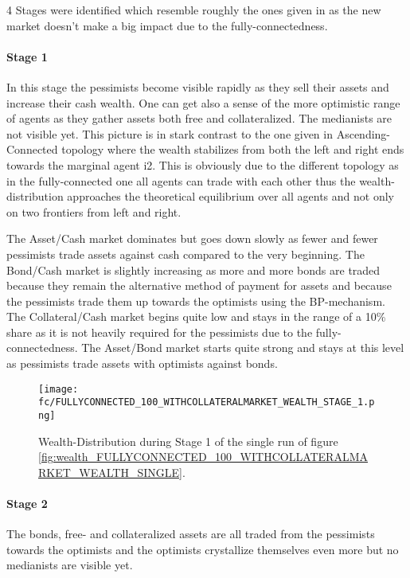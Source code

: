 \documentclass[Bachelorarbeit.tex]{subfiles}
\begin{document}
4 Stages were identified which resemble roughly the ones given in \cite{Breuer2015} as the new market doesn't make a big impact due to the fully-connectedness.


\paragraph{Stage 1}
In this stage the pessimists become visible rapidly as they sell their assets and increase their cash wealth. One can get also a sense of the more optimistic range of agents as they gather assets both free and collateralized. The medianists are not visible yet. This picture is in stark contrast to the one given in Ascending-Connected topology where the wealth stabilizes from both the left and right ends towards the marginal agent i2. This is obviously due to the different topology as in the fully-connected one all agents can trade with each other thus the wealth-distribution approaches the theoretical equilibrium over all agents and not only on two frontiers from left and right.

\medskip

The Asset/Cash market dominates but goes down slowly as fewer and fewer pessimists trade assets against cash compared to the very beginning. The Bond/Cash market is slightly increasing as more and more bonds are traded because they remain the alternative method of payment for assets and because the pessimists trade them up towards the optimists using the BP-mechanism. The Collateral/Cash market begins quite low and stays in the range of a 10\% share as it is not heavily required for the pessimists due to the fully-connectedness. The Asset/Bond market starts quite strong and stays at this level as pessimists trade assets with optimists against bonds.

\begin{figure}[H]
	\centering
  \texttt{[image: fc/FULLYCONNECTED\_100\_WITHCOLLATERALMARKET\_WEALTH\_STAGE\_1.png]}
  	\caption{Wealth-Distribution during Stage 1 of the single run of figure \ref{fig:wealth_FULLYCONNECTED_100_WITHCOLLATERALMARKET_WEALTH_SINGLE}.}
	\label{fig:markets_FULLYCONNECTED_100_WITHCOLLATERALMARKET_WEALTH_STAGE_1}
\end{figure}

\paragraph{Stage 2}
The bonds, free- and collateralized assets are all traded from the pessimists towards the optimists and the optimists crystallize themselves even more but no medianists are visible yet.
\end{document}
